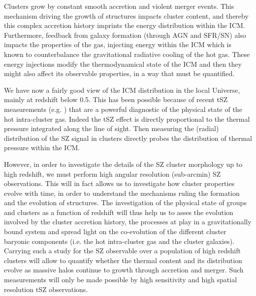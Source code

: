 \documentclass[11pt,a4paper,twoside,graphicx,color]{article}
\begin{document}
\vspace{0.3cm}  
Clusters grow by constant smooth accretion and violent merger events. This mechanism driving
the growth of structures impacts cluster content, and thereby this complex accretion history imprints
the energy distribution within the ICM. 
Furthermore, feedback from galaxy formation (through AGN and SFR/SN) also impacts the properties of the gas, injecting energy within the ICM which is known to counterbalance the gravitational radiative cooling of the hot gas. These energy injections modify the thermodynamical state of the ICM and then they might also affect its observable properties, in a way that must be quantified.

We have now a fairly good view of the ICM distribution in the local Universe, mainly at
redshift below 0.5. This has been possible because of recent tSZ measurements (e.g. \citealt{PPP, Plagge2010}) that are a
powerful diagnostic of the physical state of the hot intra-cluster gas. Indeed the tSZ effect is directly proportional to the
thermal pressure integrated along the line of sight. Then measuring the (radial) distribution of the SZ
signal in clusters directly probes the distribution of thermal pressure within the ICM. 

However, in order to investigate the details of the SZ cluster morphology up to high redshift, we must perform high angular resolution (sub-arcmin) SZ observations.
This will in fact allows us to investigate how cluster properties evolve with time, in order to understand the mechanisms ruling the formation and the evolution of structures.
The investigation of the physical state of groups and clusters as a function of redshift will thus help us to asses 
the evolution involved by the cluster accretion history, the processes at play in a gravitationally bound
system and spread light on the co-evolution of the different  cluster baryonic components (i.e. the hot intra-cluster gas and the cluster galaxies). 
Carrying such a study for the SZ observable over a population of high redshift
clusters will allow to quantify whether the thermal content and its distribution evolve as massive
halos continue to growth through accretion and merger. Such measurements will only be made possible by high sensitivity and high spatial resolution tSZ observations. 
\end{document}
